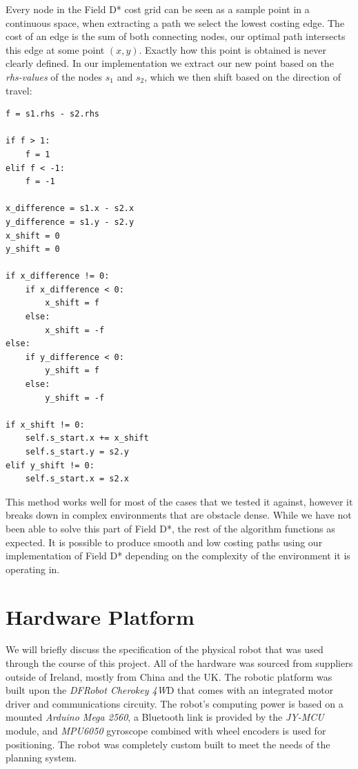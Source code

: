 \noindent
Every node in the Field D* cost grid can be seen as a sample point in a continuous space, when extracting a path we select the lowest costing edge. The cost of an edge is the sum of both connecting nodes, our optimal path intersects this edge at some point $(x, y)$. Exactly how this point is obtained is never clearly defined. In our implementation we extract our new point based on the \textit{rhs-values} of the nodes $s_{1}$ and $s_{2}$, which we then shift based on the direction of travel: \\

\begin{lstlisting}
f = s1.rhs - s2.rhs

if f > 1:
	f = 1
elif f < -1:
	f = -1

x_difference = s1.x - s2.x
y_difference = s1.y - s2.y
x_shift = 0
y_shift = 0

if x_difference != 0:
	if x_difference < 0:
		x_shift = f
	else:
		x_shift = -f
else:
	if y_difference < 0:
		y_shift = f
	else:
		y_shift = -f

if x_shift != 0:
	self.s_start.x += x_shift
	self.s_start.y = s2.y
elif y_shift != 0:
	self.s_start.x = s2.x
\end{lstlisting}

\noindent
This method works well for most of the cases that we tested it against, however it breaks down in complex environments that are obstacle dense. While we have not been able to solve this part of Field D*, the rest of the algorithm functions as expected. It is possible to produce smooth and low costing paths using our implementation of Field D* depending on the complexity of the environment it is operating in.

\newpage

\section{Hardware Platform}
\noindent
We will briefly discuss the specification of the physical robot that was used through the course of this project. All of the hardware was sourced from suppliers outside of Ireland, mostly from China and the UK. The robotic platform was built upon the \textit{DFRobot Cherokey 4W}D that comes with an integrated motor driver and communications circuity. The robot's computing power is based on a mounted \textit{Arduino Mega 2560}, a Bluetooth link is provided by the \textit{JY-MCU} module, and \textit{MPU6050} gyroscope combined with wheel encoders is used for positioning. The robot was completely custom built to meet the needs of the planning system. \\

